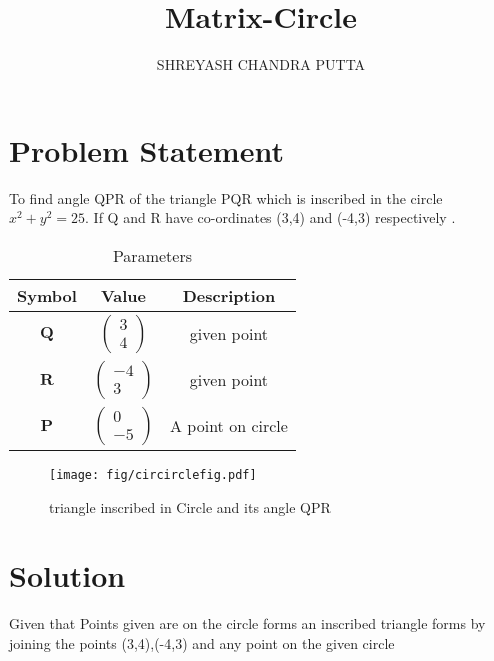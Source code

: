 \documentclass[journal,12pt,twocolumn]{article}
\title{
Matrix-Circle
}
\author{SHREYASH CHANDRA PUTTA}
\newcommand{\myvec}[1]{\ensuremath{\begin{pmatrix}#1\end{pmatrix}}}
\let\vec\mathbf
\begin{document}
\maketitle
\tableofcontents
\bigskip
\section{Problem Statement}
To find angle QPR of the triangle PQR which is inscribed in the circle $x^2 + y^2 = 25$. If Q and R  have  co-ordinates (3,4) and (-4,3) respectively .

\begin{table}[h]
    \centering
    \begin{tabular}{|c|c|c|}
       \hline
       \textbf{Symbol}&\textbf{Value}&\textbf{Description}  \\
       \hline
	    $\vec{Q}$ & $\myvec{
		    3\\
		    4}$
	    & given point\\
        \hline
	    $\vec{R}$ & $\myvec{-4\\3}$
 & given point\\
        \hline
	    $\vec{P}$ & $\myvec{0\\-5}$
 & A point on circle  \\
       \hline
    \end{tabular}
    \caption{Parameters}
    \label{tab:my_label}
\end{table}

\begin{figure}[h]
    \centering
\texttt{[image: fig/circirclefig.pdf]}
    \caption{triangle inscribed in Circle and its angle QPR }
    \label{fig:my_label}
\end{figure}
\vspace{2cm}
\section{Solution}
Given that Points given are on the circle forms an inscribed triangle forms by joining the points (3,4),(-4,3) and any point on the given circle   \\
\end{document}
